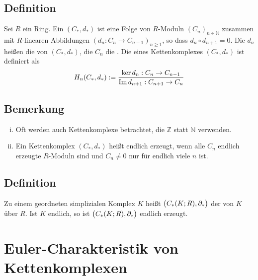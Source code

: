 \subsection[Definition: $R$-Kettenkomplex, $n$-te Homologie eines $R$-Kettenkomplexes]{Definition} %
\label{sub:312}
Sei $R$ ein Ring. Ein  $(C_*, d_*)$ ist eine Folge von $R$-Moduln $(C_n)_{n \in \mathds{N}}$ zusammen mit $R$-linearen Abbildungen 
$(d_n : C_n \to C_{n-1})_{n \ge 1}$, so dass $d_n \circ d_{n+1} = 0$. Die $d_n$ heißen die  von $(C_*,d_*)$, die $C_n$ die .
Die  eines Kettenkomplexes $(C_*,d_*)$ ist definiert als
\[
	H_n(C_*, d_*) := \frac{\ker d_n : C_n \to C_{n-1}}{\im d_{n+1} : C_{n+1} \to C_n} 
\]

\subsection[Bemerkungen zu Kettenkomplexen]{Bemerkung} %
\label{sub:313}
\begin{enumerate}[(i)]
	\item Oft werden auch Kettenkomplexe betrachtet, die $\mathds{Z}$ statt $\mathds{N}$ verwenden.
	\item Ein Kettenkomplex $(C_*,d_*)$ heißt endlich erzeugt, wenn alle $C_n$ endlich erzeugte $R$-Moduln sind und $C_n \not= 0$ nur für endlich viele $n$ ist.
\end{enumerate}

\subsection[Definition: Simplizialer Kettenkomplex]{Definition} %
\label{sub:314}
Zu einem geordneten simplizialen Komplex $K$ heißt $\enbrace[\big]{C_*(K;R), \partial_*}$ der  von $K$ über 
$R$. 
Ist $K$ endlich, so ist $\enbrace[\big]{C_*(K;R), \partial_*}$ endlich erzeugt.
\newpage

\section{Euler-Charakteristik von Kettenkomplexen} %
\label{sec:4}

